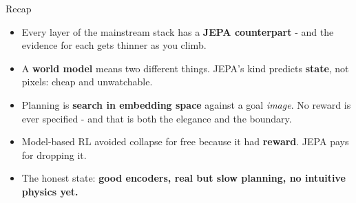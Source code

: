 \documentclass[aspectratio=169]{beamer}
\begin{document}
\begin{frame}{Recap}
  \small
  \begin{itemize}\small
    \item Every layer of the mainstream stack has a \textbf{JEPA counterpart} - and the
      evidence for each gets thinner as you climb.
    \item A \textbf{world model} means two different things. JEPA's kind predicts
      \textbf{state}, not pixels: cheap and unwatchable.
    \item Planning is \textbf{search in embedding space} against a goal \emph{image}. No
      reward is ever specified - and that is both the elegance and the boundary.
    \item Model-based RL avoided collapse for free because it had \textbf{reward}. JEPA
      pays for dropping it.
    \item The honest state: \textbf{good encoders, real but slow planning, no intuitive
      physics yet.}
  \end{itemize}
  \vskip 4pt
  \begin{center}
  \end{center}
\end{frame}
\end{document}
